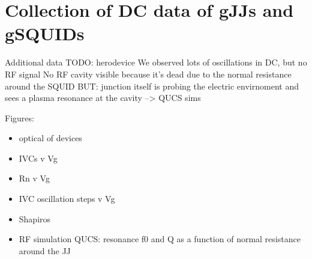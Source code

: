 \chapter{Collection of DC data of gJJs and gSQUIDs}
\label{chap:gJJmisc}

%
%

\newpage

Additional data
TODO: herodevice
We observed lots of oscillations in DC, but no RF signal
No RF cavity visible because it's dead due to the normal resistance around the SQUID
BUT: junction itself is probing the electric envirnoment and sees a plasma resonance at the cavity --> QUCS sims

Figures:
\begin{itemize}
	\item optical of devices
	\item IVCs v Vg
	\item Rn v Vg
	\item IVC oscillation steps v Vg
	\item Shapiros
	\item RF simulation QUCS: resonance f0 and Q as a function of normal resistance around the JJ
\end{itemize}

\clearpage
{}

